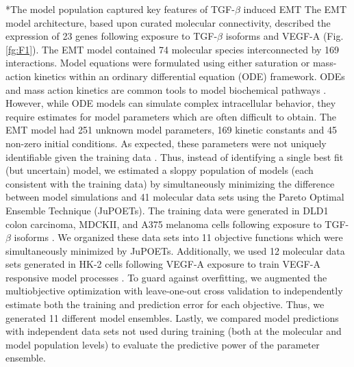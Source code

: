 \documentclass[12pt]{article}
\makeatletter
\renewcommand\subsection{\@startsection
	{subsection}{2}{0mm}
	{-0.05in}
	{-0.5\baselineskip}
	{\normalfont\normalsize\bfseries}}
\makeatother
\begin{document}
\subsection*{The model population captured key features of TGF-$\beta$ induced EMT}
The EMT model architecture, based upon curated molecular connectivity,
described the expression of 23 genes following exposure to TGF-$\beta$ isoforms and VEGF-A (Fig. \ref{fg:F1}).
The EMT model contained 74 molecular species interconnected by 169 interactions.
Model equations were formulated using either saturation or mass-action kinetics within an ordinary differential equation (ODE) framework.
ODEs and mass action kinetics are common tools to model biochemical pathways \citep{Schoeberl:2002rv,Chen:2009uq,Tasseff:2011ve}.
However, while ODE models can simulate complex intracellular behavior,
they require estimates for model parameters which are often difficult to obtain.
The EMT model had 251 unknown model parameters, 169 kinetic constants and 45 non-zero initial conditions.
As expected, these parameters were not uniquely identifiable given the training data \citep{Gadkar:2005vn}.
Thus, instead of identifying a single best fit (but uncertain) model,
we estimated a sloppy population of models (each consistent with the training data) by simultaneously minimizing the difference between model simulations and 41 molecular
data sets using the Pareto Optimal Ensemble Technique (JuPOETs).
The training data were generated in DLD1 colon carcinoma, MDCKII, and A375 melanoma cells following
exposure to TGF-$\beta$ isoforms \citep{Medici:2008fk}. We organized these data sets into 11 objective functions which were simultaneously minimized by JuPOETs.
Additionally, we used 12 molecular data sets generated in HK-2 cells following VEGF-A exposure to train VEGF-A responsive model processes \citep{Lian:2011bs}.
To guard against overfitting, we augmented the multiobjective optimization with leave-one-out cross validation to independently estimate both the training and
prediction error for each objective. Thus, we generated 11 different model ensembles.
Lastly, we compared model predictions with independent data sets not used during training (both at the molecular and model population
levels) to evaluate the predictive power of the parameter ensemble.
\end{document}
